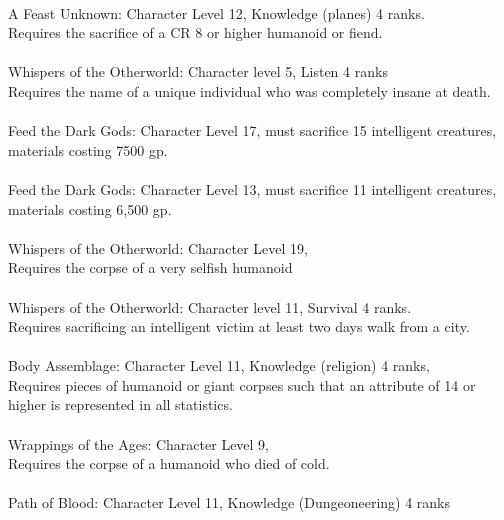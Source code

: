 \begin{multicols}{2}
\begin{small}
\listone
{}\\
A Feast Unknown: Character Level 12, Knowledge (planes) 4 ranks.\\
Requires the sacrifice of a CR 8 or higher humanoid or fiend.\\
\\
Whispers of the Otherworld: Character level 5, Listen 4 ranks\\
Requires the name of a unique individual who was completely insane at death.\\
\\
Feed the Dark Gods: Character Level 17, must sacrifice 15 intelligent creatures, materials costing 7500 gp.\\
\\
Feed the Dark Gods: Character Level 13, must sacrifice 11 intelligent creatures, materials costing 6,500 gp.\\
\\
Whispers of the Otherworld: Character Level 19, \\
Requires the corpse of a very selfish humanoid\\
\\
Whispers of the Otherworld: Character level 11, Survival 4 ranks.\\
Requires sacrificing an intelligent victim at least two days walk from a city.\\
\\
Body Assemblage: Character Level 11, Knowledge (religion) 4 ranks, \\
Requires pieces of humanoid or giant corpses such that an attribute of 14 or higher is represented in all statistics.\\
\\
Wrappings of the Ages: Character Level 9, \\
Requires the corpse of a humanoid who died of cold.\\
\\
Path of Blood: Character Level 11, Knowledge (Dungeoneering) 4 ranks\\

\end{small}
\end{multicols}
